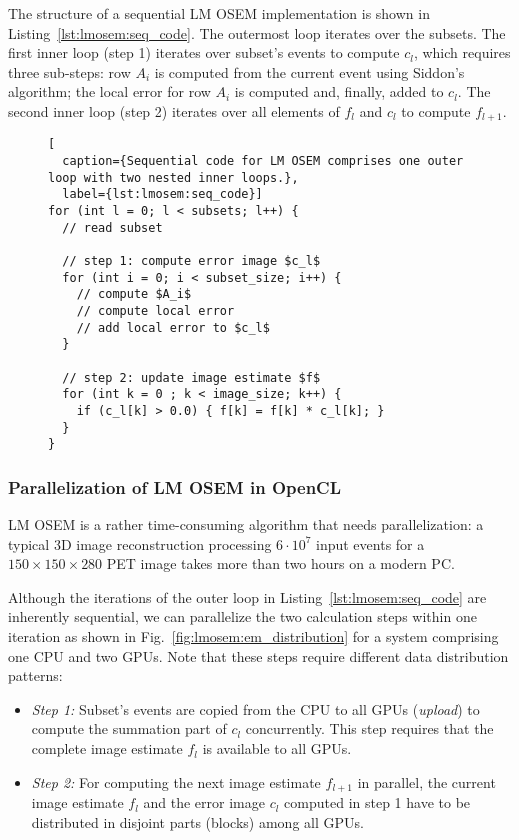 The structure of a sequential LM OSEM implementation is shown in Listing~\ref{lst:lmosem:seq_code}.
The outermost loop iterates over the subsets.
The first inner loop (step 1) iterates over subset's events to compute $c_l$, which requires three sub-steps:
row $A_i$ is computed from the current event using Siddon's algorithm;
the local error for row $A_i$ is computed and, finally, added to $c_l$.
The second inner loop (step 2) iterates over all elements of $f_l$ and $c_l$ to compute $f_{l+1}$.
\begin{figure}
\begin{lstlisting}[
  caption={Sequential code for LM OSEM comprises one outer loop with two nested inner loops.},
  label={lst:lmosem:seq_code}]
for (int l = 0; l < subsets; l++) {
  // read subset

  // step 1: compute error image $c_l$
  for (int i = 0; i < subset_size; i++) {
    // compute $A_i$
    // compute local error
    // add local error to $c_l$
  }

  // step 2: update image estimate $f$
  for (int k = 0 ; k < image_size; k++) {
    if (c_l[k] > 0.0) { f[k] = f[k] * c_l[k]; }
  }
}
\end{lstlisting}
\end{figure}

\subsubsection{Parallelization of LM OSEM in OpenCL}
\label{sec:parallel_implementation}
LM OSEM is a rather time-consuming algorithm that needs parallelization:
a typical 3D image reconstruction processing $6 \cdot 10^7$ input events for a $150 \times 150 \times 280$ PET image takes more than two hours on a modern PC.

Although the iterations of the outer loop in Listing~\ref{lst:lmosem:seq_code} are inherently sequential, we can parallelize the two calculation steps within one iteration as shown in Fig.~\ref{fig:lmosem:em_distribution} for a system comprising one CPU and two GPUs.
Note that these steps require different data distribution patterns:
\begin{itemize}
  \item[] \emph{Step 1:} Subset's events are copied from the CPU to all GPUs (\emph{upload}) to compute the summation part of $c_l$ concurrently. This step requires that the complete image estimate $f_l$ is available to all GPUs.
  \item[] \emph{Step 2:} For computing the next image estimate $f_{l+1}$ in parallel, the current image estimate $f_l$ and the error image $c_l$ computed in step 1 have to be distributed in disjoint parts (blocks) among all GPUs.
\end{itemize}

